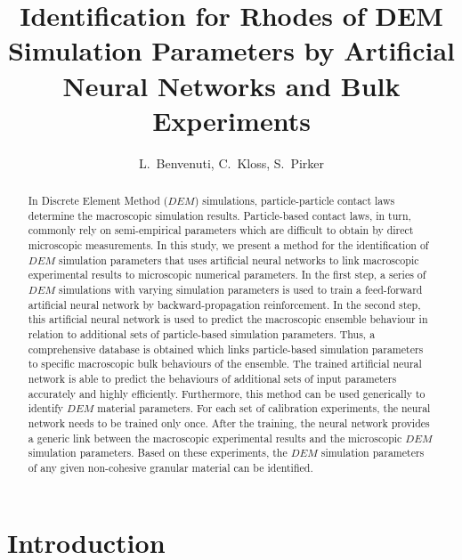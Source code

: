 \documentclass{llncs}
\begin{document}
\title{Identification for Rhodes of DEM Simulation Parameters by Artificial
Neural Networks and Bulk Experiments}

\author{L.~Benvenuti, C.~Kloss, S.~Pirker}

\maketitle

\begin{abstract}

In Discrete Element Method ($DEM$) simulations, particle-particle contact laws
determine the macroscopic simulation results. Particle-based contact laws, in
turn, commonly rely on semi-empirical parameters which are difficult to obtain
by direct microscopic measurements.
In this study, we present a method for the identification of
$DEM$ simulation parameters 
that uses artificial neural networks to link
macroscopic experimental results to
microscopic numerical parameters.
In the first step, a series
of $DEM$ simulations with varying simulation parameters is used to train a
feed-forward artificial neural network by backward-propagation reinforcement. 
In the second step, this artificial neural network is used to predict the
macroscopic ensemble behaviour in relation to additional sets of particle-based
simulation parameters.
Thus, a comprehensive database is obtained
which links particle-based simulation parameters to specific macroscopic
bulk behaviours of the ensemble.
The trained artificial neural network is able to predict the behaviours of
additional sets of input parameters accurately and highly efficiently.
Furthermore, this method can be used generically to
identify $DEM$ material parameters.
For each set of calibration experiments, the neural network 
needs to be trained only once.
After the training, the neural network provides a generic link between the macroscopic 
experimental results and the microscopic $DEM$ simulation parameters.
Based on these experiments, the $DEM$ simulation parameters of any given
non-cohesive granular material can be identified.

\end{abstract}

\section{Introduction}
\label{sec:introduction}
\end{document}
